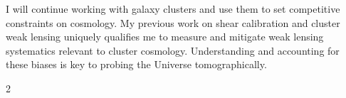\documentclass[11pt]{article}
\begin{document}
I will continue working with galaxy clusters and use them to set competitive constraints on cosmology.
My previous work on shear calibration and cluster weak lensing uniquely qualifies me to measure and mitigate weak lensing systematics relevant to cluster cosmology.
Understanding and accounting for these biases is key to probing the Universe tomographically.
\begin{multicols}{2}
\setlength\bibitemsep{0pt}
\printbibliography
\end{multicols}
\end{document}
